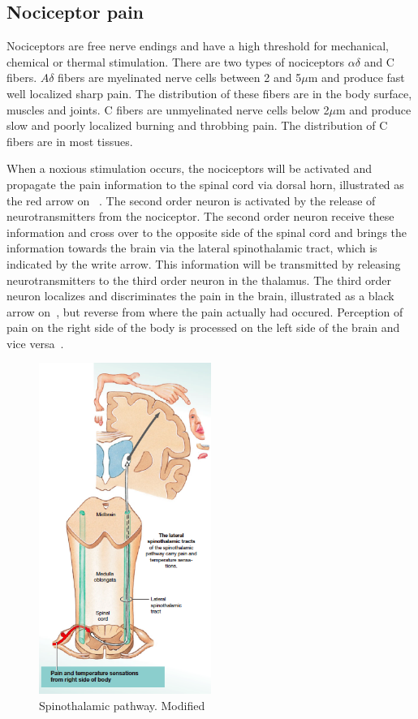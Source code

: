 \subsection{Nociceptor pain}
Nociceptors are free nerve endings and have a high threshold for mechanical, chemical or thermal stimulation. There are two types of nociceptors $\alpha\delta$ and C fibers. $A\delta$ fibers are myelinated nerve cells between 2 and 5$\mu$m and produce fast well localized sharp pain. The distribution of these fibers are in the body surface, muscles and joints. C fibers are unmyelinated nerve cells below 2$\mu$m and produce slow and poorly localized burning and throbbing pain. The distribution of C fibers are in most tissues. \cite{Steeds2013}

When a noxious stimulation occurs, the nociceptors will be activated and propagate the pain information to the spinal cord via dorsal horn, illustrated as the red arrow on ~\cite{Martini2012}. The second order neuron is activated by the release of neurotransmitters from the nociceptor. The second order neuron receive these information and cross over to the opposite side of the spinal cord and brings the information towards the brain via the lateral spinothalamic tract, which is indicated by the write arrow. This information will be transmitted by releasing neurotransmitters to the third order neuron in the thalamus. The third order neuron localizes and discriminates the pain in the brain, illustrated as a black arrow on~, but reverse from where the pain actually had occured. Perception of pain on the right side of the body is processed on the left side of the brain and vice versa~\cite{Martini2012}. 


\begin{figure}[H]
	\includegraphics[width=0.5\textwidth]{figures/pathways.png} 
	\caption{Spinothalamic pathway. Modified~\cite{Martini2012}}
	\label{fig:pathways}  
\end{figure}   


